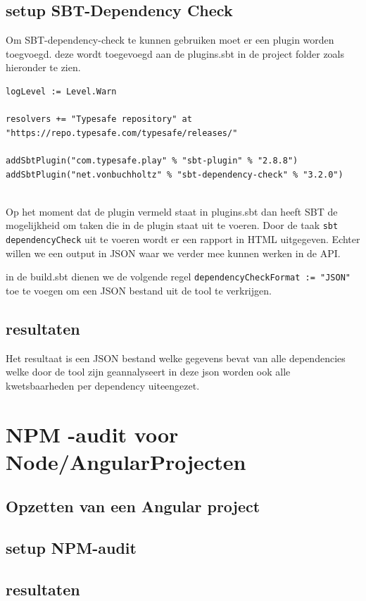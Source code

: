 \subsection{setup SBT-Dependency Check}\label{subsec:setup-sbt-dependency-check}
Om SBT-dependency-check te kunnen gebruiken moet er een plugin worden toegvoegd. deze wordt toegevoegd aan de plugins.sbt in de project folder zoals hieronder te zien.
\begin{lstlisting}[caption={plugin.sbt.sbt},label=lst:plugin.sbt]
logLevel := Level.Warn

resolvers += "Typesafe repository" at "https://repo.typesafe.com/typesafe/releases/"

addSbtPlugin("com.typesafe.play" % "sbt-plugin" % "2.8.8")
addSbtPlugin("net.vonbuchholtz" % "sbt-dependency-check" % "3.2.0")


\end{lstlisting}
Op het moment dat de plugin vermeld staat in plugins.sbt dan heeft SBT de mogelijkheid om taken die in de plugin staat uit te voeren. Door de taak \texttt{sbt dependencyCheck} uit te voeren wordt er een rapport in HTML uitgegeven. Echter willen we een output in JSON waar we verder mee kunnen werken in de API.

in de build.sbt dienen we de volgende regel \texttt{dependencyCheckFormat := "JSON"} toe te voegen om een JSON bestand uit de tool te verkrijgen.

\subsection{resultaten}\label{subsec:SBTResultaten}
Het resultaat is een JSON bestand welke gegevens bevat van alle dependencies welke door de tool zijn geannalyseert in deze json worden ook alle kwetsbaarheden per dependency uiteengezet.


\section{NPM -audit voor Node/AngularProjecten}\label{sec:npm--audit-voor-node/angularprojecten}

\subsection{Opzetten van een Angular project}\label{subsec:opzetten-van-een-project-ang}

\subsection{setup NPM-audit}\label{subsec:setup-npm-audit}
\subsection{resultaten}\label{subsec:ang-resultaten}

